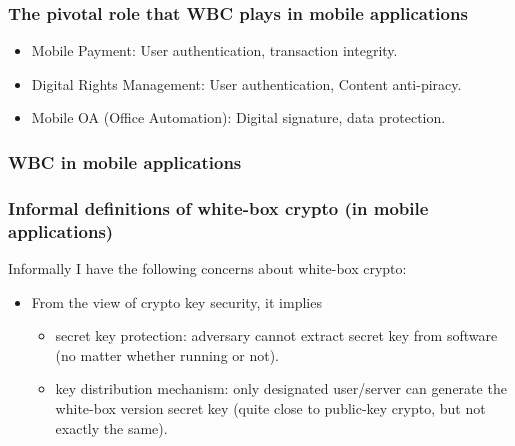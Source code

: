 \documentclass[aspectratio=169,xcolor=dvipsnames]{beamer}
\begin{document}
\frame
{
\frametitle{The pivotal role that WBC plays in mobile applications}
\begin{itemize}
\setlength{\itemsep}{12pt}
\item Mobile Payment: User authentication, transaction integrity.

\item Digital Rights Management: User authentication, Content anti-piracy.

\item Mobile OA (Office Automation): Digital signature, data protection.
\end{itemize}

}

\frame
{
\frametitle{WBC in mobile applications}
\begin{center}
\end{center}

}

\frame
{
\frametitle{Informal definitions of white-box crypto (in mobile applications)}
Informally I have the following concerns about white-box crypto:
\begin{itemize}
\setlength{\itemsep}{12pt}
\item From the view of crypto key security, it implies
\begin{itemize}
\setlength{\itemsep}{12pt}
\item secret key protection: adversary cannot extract secret key from software (no matter whether running or not).

\item key distribution mechanism: only designated user/server can generate the white-box version secret key (quite close to public-key crypto, but not exactly the same).

\end{itemize}
\end{itemize}
}
\end{document}
